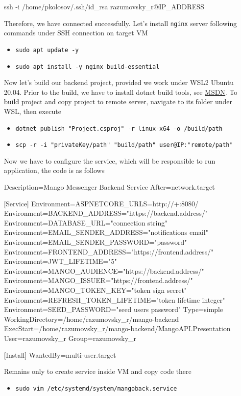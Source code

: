 \begin{spverbatim}
    ssh -i /home/pkolosov/.ssh/id_rsa razumovsky_r@IP_ADDRESS
\end{spverbatim}

Therefore, we have connected successfully.
Let's install \texttt{nginx} server following commands under SSH connection on target VM
\begin{itemize}
    \item \texttt{sudo apt update -y}
    \item \texttt{sudo apt install -y nginx build-essential}
\end{itemize}
Now let's build our backend project, provided we work under WSL2 Ubuntu 20.04.
Prior to the build, we have to install dotnet build tools, see
\href{https://docs.microsoft.com/en-us/dotnet/core/install/linux-ubuntu}{MSDN}.
To build project and copy project to remote server,
navigate to its folder under WSL, then execute

\begin{itemize}
    \item \texttt{dotnet publish "Project.csproj" -r linux-x64 -o /build/path}
    \item \texttt{scp -r -i "privateKey/path" "build/path" user@IP:"remote/path"}
\end{itemize}

Now we have to configure the service, which will be responsible to run application,
the code is as follows

\begin{center}
    \begin{spverbatim}
        [Unit]
        Description=Mango Messenger Backend Service
        After=network.target

        [Service]
        Environment=ASPNETCORE_URLS=http://+:8080/
        Environment=BACKEND_ADDRESS="https://backend.address/"
        Environment=DATABASE_URL="connection string"
        Environment=EMAIL_SENDER_ADDRESS="notifications email"
        Environment=EMAIL_SENDER_PASSWORD="password"
        Environment=FRONTEND_ADDRESS="https://frontend.address/"
        Environment=JWT_LIFETIME="5"
        Environment=MANGO_AUDIENCE="https://backend.address/"
        Environment=MANGO_ISSUER="https://frontend.address/"
        Environment=MANGO_TOKEN_KEY="token sign secret"
        Environment=REFRESH_TOKEN_LIFETIME="token lifetime integer"
        Environment=SEED_PASSWORD="seed users password"
        Type=simple
        WorkingDirectory=/home/razumovsky_r/mango-backend
        ExecStart=/home/razumovsky_r/mango-backend/MangoAPI.Presentation
        User=razumovsky_r
        Group=razumovsky_r

        [Install]
        WantedBy=multi-user.target
    \end{spverbatim}
\end{center}
Remains only to create service inside VM and copy code there
\begin{itemize}
    \item \texttt{sudo vim /etc/systemd/system/mangoback.service}
\end{itemize}